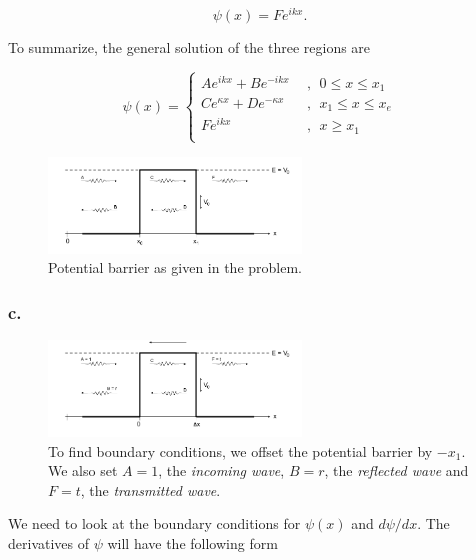 \documentclass{article}
\begin{document}
\begin{equation}
\psi(x) = Fe^{ikx}.
\end{equation}

To summarize, the general solution of the three regions are

\begin{equation}
\psi(x) = \begin{cases}
Ae^{ikx} + Be^{-ikx} \ \ &, \ \ 0 \leq x \leq x_1 \\
Ce^{\kappa x} + De^{-\kappa x} \ \ &, \ \ x_1 \leq x \leq x_e \\
Fe^{ikx}  &, \ \ x \geq x_1 \\
\end{cases}
\end{equation}


\begin{figure}[t]
\centering
\includegraphics[width=0.6\textwidth]{potentialbarriere}
\caption{Potential barrier as given in the problem.}
\label{fig:figure_label}
\end{figure}


\subsubsection*{c.}

\begin{figure}[t]
\centering
\includegraphics[width=0.6\textwidth]{potentialbarriereoffset}
\caption{To find boundary conditions, we offset the potential barrier by $-x_1$. We also set $A=1$, the \textit{incoming wave}, $B=r$, the \textit{reflected wave} and $F=t$, the \textit{transmitted wave}.}
\label{fig:figure_label}
\end{figure}

We need to look at the boundary conditions for $\psi(x)$ and $d\psi/dx$. The derivatives of $\psi$ will have the following form
\end{document}
